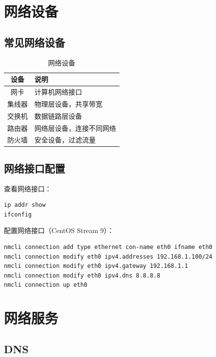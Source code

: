 \documentclass[12pt,UTF8]{ctexbook}
\begin{document}
\chapter{网络设备}
\label{chap:network_devices}

\section{常见网络设备}
\label{sec:common_devices}

\begin{table}[htbp]
    \centering
    \caption{网络设备}
    \begin{tabular}{|c|p{8cm}|}
        \hline
        \textbf{设备} & \textbf{说明} \\
        \hline
        网卡 & 计算机网络接口 \\
        \hline
        集线器 & 物理层设备，共享带宽 \\
        \hline
        交换机 & 数据链路层设备 \\
        \hline
        路由器 & 网络层设备，连接不同网络 \\
        \hline
        防火墙 & 安全设备，过滤流量 \\
        \hline
    \end{tabular}
\end{table}

\section{网络接口配置}
\label{sec:interface_config}

查看网络接口：
\begin{verbatim}
ip addr show
ifconfig
\end{verbatim}

配置网络接口（CentOS Stream 9）：
\begin{verbatim}
nmcli connection add type ethernet con-name eth0 ifname eth0
nmcli connection modify eth0 ipv4.addresses 192.168.1.100/24
nmcli connection modify eth0 ipv4.gateway 192.168.1.1
nmcli connection modify eth0 ipv4.dns 8.8.8.8
nmcli connection up eth0
\end{verbatim}

\chapter{网络服务}
\label{chap:network_services}

\section{DNS}
\label{sec:dns}
\end{document}
